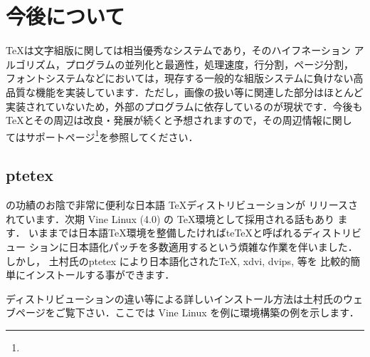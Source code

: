 \section{今後について}

\TeX は文字組版に関しては相当優秀なシステムであり，そのハイフネーション
アルゴリズム，プログラムの並列化と最適性，処理速度，行分割，ページ分割，
フォントシステムなどにおいては，現存する一般的な組版システムに負けない高
品質な機能を実装しています．ただし，画像の扱い等に関連した部分はほとんど
実装されていないため，外部のプログラムに依存しているのが現状です．今後も
\TeX とその周辺は改良・発展が続くと予想されますので，その周辺情報に関し
てはサポートページ\footnote{\webThorTypo}を参照してください．

\newcommand*\ptetex{ptetex\xspace}

\subsection{\ptetex}

の功績のお陰で非常に便利な日本語 \TeX ディストリビューションが
リリースされています．次期 Vine Linux (4.0) の \TeX 環境として採用される話もあり
ます．
いままでは日本語\TeX 環境を整備したければte\TeX と呼ばれるディストリビュー
ションに日本語化パッチを多数適用するという煩雑な作業を伴いました．しかし，
土村氏の\ptetex により日本語化された\TeX, xdvi, dvips, \Dvipdfmx 等を
比較的簡単にインストールする事ができます．

ディストリビューションの違い等による詳しいインストール方法は土村氏のウェ
ブページをご覧下さい．ここでは Vine Linux を例に環境構築の例を示します．

